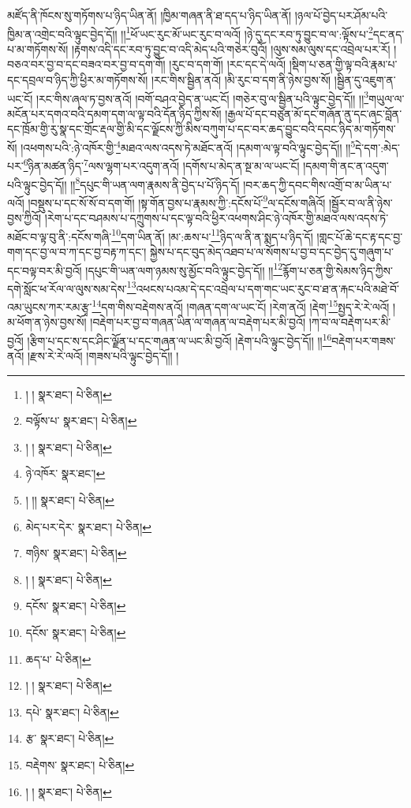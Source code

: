 མཛོད་ནི་ཁོངས་སུ་གཏོགས་པ་ཉིད་ཡིན་ནོ། །ཁྱིམ་གཞན་ནི་ཐ་དད་པ་ཉིད་ཡིན་ནོ། །ཉལ་པོ་བྱེད་པར་ཤོམ་པའི་ཁྱིམ་ན་འགྲེང་བའི་ལྟུང་བྱེད་དོ།། །།\footnote{། །  སྣར་ཐང་།  པེ་ཅིན། }ཕོ་ཡང་རུང་མོ་ཡང་རུང་བ་ལའོ། །ཉེ་དུ་དང་རབ་ཏུ་བྱུང་བ་ལ་:ལྟོས་པ་\footnote{བལྟོས་པ་  སྣར་ཐང་།  པེ་ཅིན། }དང་ནད་པ་མ་གཏོགས་སོ། །རྟགས་འདི་དང་རབ་ཏུ་བྱུང་བ་འདི་མེད་པའི་གཅེར་བུའོ། །ལུས་སམ་ལུས་དང་འབྲེལ་པར་རོ། །བཅའ་བར་བྱ་བ་དང་བཟའ་བར་བྱ་བ་དག་གོ། །རུང་བ་དག་གོ། །རང་དང་དེ་ལའོ། །སྡིག་པ་ཅན་གྱི་ལྟ་བའི་རྣམ་པ་དང་དབྲལ་བ་ཉིད་ཀྱི་ཕྱིར་མ་གཏོགས་སོ། །རང་གིས་སྦྱིན་ནའོ། །མི་རུང་བ་དག་ནི་ཉེས་བྱས་སོ། །སྦྱིན་དུ་འཇུག་ན་ཡང་ངོ། །རང་གིས་ཞལ་ཏ་བྱས་ནའོ། །བགོ་བཤའ་བྱེད་ན་ཡང་ངོ། །གཅེར་བུ་ལ་སྦྱིན་པའི་ལྟུང་བྱེད་དོ།། །།\footnote{། །  སྣར་ཐང་།  པེ་ཅིན། }གཡུལ་ལ་མངོན་པར་དགའ་བའི་དམག་དག་ལ་ལྟ་བའི་དོན་ཉིད་ཀྱིས་སོ། །རྒྱལ་པོ་དང་བཙུན་མོ་དང་གཞོན་ནུ་དང་ཞང་བློན་དང་ཁྲོམ་གྱི་རུ་སྣ་དང་གྲོང་རྡལ་གྱི་མི་དང་ལྗོངས་ཀྱི་མིས་བཀུག་པ་དང་བར་ཆད་བྱུང་བའི་དབང་ཉིད་མ་གཏོགས་སོ། །འཕགས་པའི་:ཉེ་འཁོར་གྱི་\footnote{ཉེ་འཁོར་  སྣར་ཐང་། }མཐའ་ལས་འདས་ཏེ་མཐོང་ནའོ། །དམག་ལ་ལྟ་བའི་ལྟུང་བྱེད་དོ།། །།\footnote{། །།  སྣར་ཐང་།  པེ་ཅིན། }དེ་དག་:མེད་པར་\footnote{མེད་པར་དེར་  སྣར་ཐང་།  པེ་ཅིན། }ཉིན་མཚན་ཉིད་\footnote{གཉིས་  སྣར་ཐང་།  པེ་ཅིན། }ལས་ལྷག་པར་འདུག་ནའོ། །དགོས་པ་མེད་ན་སྔ་མ་ལ་ཡང་ངོ། །དམག་གི་ནང་ན་འདུག་པའི་ལྟུང་བྱེད་དོ།། །།\footnote{། །  སྣར་ཐང་།  པེ་ཅིན། }དཔུང་གི་ཡན་ལག་རྣམས་ནི་བྱེད་པ་པོ་ཉིད་དོ། །བར་ཆད་ཀྱི་དབང་གིས་འགྲོ་བ་མ་ཡིན་པ་ལའོ། །བསྡུས་པ་དང་སོ་སོ་བ་དག་གོ། །སྟ་གོན་བྱས་པ་རྣམས་ཀྱི་:དངོས་པོ་\footnote{དངོས་  སྣར་ཐང་།  པེ་ཅིན། }ལ་དངོས་གཞིའོ། །སྦྱོར་བ་ལ་ནི་ཉེས་བྱས་ཀྱིའོ། །རེག་པ་དང་བཤམས་པ་དཀྲུགས་པ་དང་ལྟ་བའི་ཕྱིར་འཕགས་ཤིང་ཉེ་འཁོར་གྱི་མཐའ་ལས་འདས་ཏེ་མཐོང་བ་ལྟ་བུ་ནི་:དངོས་གཞི་\footnote{དངོས་  སྣར་ཐང་།  པེ་ཅིན། }དག་ཡིན་ནོ། །མ་:ཆས་པ་\footnote{ཆད་པ་  པེ་ཅིན། }ཉིད་ལ་ནི་ན་སྨད་པ་ཉིད་དོ། །གླང་པོ་ཆེ་དང་རྟ་དང་བྱ་གག་དང་བྱ་ལ་བ་ཀ་དང་བྱ་བརྟ་ཀ་དང་། སྐྱེས་པ་དང་བུད་མེད་འཐབ་པ་ལ་སོགས་པ་བྱ་བ་དང་བྱེད་དུ་གཞུག་པ་དང་བལྟ་བར་མི་བྱའོ། །དཔུང་གི་ཡན་ལག་ཉམས་སུ་མྱོང་བའི་ལྟུང་བྱེད་དོ།། །།\footnote{། །  སྣར་ཐང་།  པེ་ཅིན། }རྙོག་པ་ཅན་གྱི་སེམས་ཉིད་ཀྱིས་དགེ་སློང་ཕ་རོལ་ལ་ལུས་སམ་དེས་\footnote{དཔེ་  སྣར་ཐང་།  པེ་ཅིན། }འཕངས་པའམ་དེ་དང་འབྲེལ་པ་དག་གང་ཡང་རུང་བ་ཐ་ན་རྐང་པའི་མཐེ་བོ་འམ་ཡུངས་ཀར་རམ་རྩྭ་\footnote{རྩ་  སྣར་ཐང་།  པེ་ཅིན། }དག་གིས་བརྡེགས་ནའོ། །གཞན་དག་ལ་ཡང་ངོ། །རེག་ནའོ། །རྡེག་\footnote{བརྡེགས་  སྣར་ཐང་།  པེ་ཅིན། }སྤྱད་རེ་རེ་ལའོ། །མ་ཕོག་ན་ཉེས་བྱས་སོ། །བརྡེག་པར་བྱ་བ་གཞན་ཡིན་ལ་གཞན་ལ་བརྡེག་པར་མི་བྱའོ། །ཀ་བ་ལ་བརྡེག་པར་མི་བྱའོ། །རྩིག་པ་དང་ས་དང་ཤིང་ལྗོན་པ་དང་གཞན་ལ་ཡང་མི་བྱའོ། །རྡེག་པའི་ལྟུང་བྱེད་དོ།། །།\footnote{། །  སྣར་ཐང་།  པེ་ཅིན། }བརྡེག་པར་གཟས་ནའོ། །རྫས་རེ་རེ་ལའོ། །གཟས་པའི་ལྟུང་བྱེད་དོ།། །
